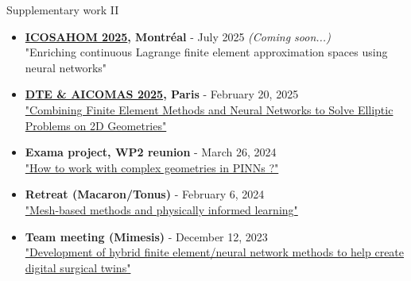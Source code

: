 \begin{frame}{Supplementary work II}
    \small 

	\begin{tcolorbox}[
		skin=bicolor,
		colback=other, %
		colbacklower=other!20!white,
		title={Talks},
		arc=2mm, %
		boxrule=0.5pt, %
		breakable, enhanced jigsaw,
		width=\linewidth,
		opacityback=0.1
		]
		
		\begin{itemize}[\textcolor{other}{$\blacktriangleright$}]
            \item \textbf{\href{https://icosahom2025.org/}{ICOSAHOM 2025}, Montréal} - July 2025 \textit{(Coming soon...)} \\
            "Enriching continuous Lagrange finite element approximation spaces using neural networks" 
            \item \textbf{\href{https://dte_aicomas_2025.iacm.info/organizers}{DTE \& AICOMAS 2025}, Paris} - February 20, 2025 \\
            \href{https://flecourtier.github.io/these2023/these2023/1.0.3/_attachments/presentation/2025_02_20.pdf}{"Combining Finite Element Methods and Neural Networks to Solve Elliptic Problems on 2D Geometries"}
			\item \textbf{Exama project, WP2 reunion} - March 26, 2024 \\
			\href{https://flecourtier.github.io/these2023/these2023/1.0.3/_attachments/presentation/2024_03_26.pdf}{"How to work with complex geometries in PINNs ?"}
			\item \textbf{Retreat (Macaron/Tonus)} - February 6, 2024 \\
			\href{https://flecourtier.github.io/these2023/these2023/1.0.3/_attachments/presentation/2024_02_06.pdf}{"Mesh-based methods and physically informed learning"}
			\item \textbf{Team meeting (Mimesis)} - December 12, 2023 \\
            \href{https://flecourtier.github.io/these2023/these2023/1.0.3/_attachments/presentation/2023_12_12.pdf}{"Development of hybrid finite element/neural network methods to help create digital surgical twins"}
		\end{itemize}
	\end{tcolorbox}
\end{frame}

